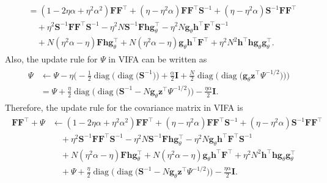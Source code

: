 \documentclass[msc,deptreport.inf]{infthesis} %
\newcommand{\matr}[1]{\mathbf{#1}}
\newcommand{\diag}{\mathop{\mathrm{diag}}}
\begin{document}
\begin{align}
\begin{split}
	& = (1 - 2\eta \alpha + \eta^2 \alpha^2) \matr{F}\matr{F}^\intercal
	+ (\eta - \eta^2 \alpha) \matr{F} \matr{F}^\intercal \matr{S}^{-1}
	+ (\eta - \eta^2 \alpha) \matr{S}^{-1} \matr{F} \matr{F}^\intercal \\
	& \quad + \eta^2 \matr{S}^{-1} \matr{F} \matr{F}^\intercal \matr{S}^{-1}
	- \eta^2 N \matr{S}^{-1} \matr{F} \matr{h} \matr{g}_\theta^\intercal
	- \eta^2 N \matr{g}_\theta \matr{h}^\intercal \matr{F}^\intercal \matr{S}^{-1} \\
	& \quad + N (\eta^2 \alpha - \eta) \matr{F} \matr{h} \matr{g}_\theta^\intercal
	+ N (\eta^2 \alpha - \eta) \matr{g}_\theta \matr{h}^\intercal \matr{F}^\intercal 
	+ \eta^2 N^2 \matr{h}^\intercal \matr{h} \matr{g}_\theta \matr{g}_\theta^\intercal.
\end{split}
\end{align}
Also, the update rule for $\Psi$ in VIFA can be written as
\begin{align}
\begin{split}
	\Psi & \leftarrow \Psi - \eta\Big(
		-\frac{1}{2} \diag\big(\diag\big(\matr{S}^{-1}\big)\big) 
		+\frac{\alpha}{2} \matr{I} 
		+\frac{N}{2} \diag\big(\diag\big( \matr{g}_\theta \matr{z}^\intercal \Psi^{-1/2} \big)\big) 
	\Big) \\
	& = \Psi +
		\frac{\eta}{2} \diag\Big(\diag\big(\matr{S}^{-1} - N \matr{g}_\theta \matr{z}^\intercal \Psi^{-1/2} \big)\Big) 
		- \frac{\eta \alpha}{2} \matr{I}.
\end{split}
\end{align}
Therefore, the update rule for the covariance matrix in VIFA is
\begin{align}
\begin{split}
	\matr{F}\matr{F}^\intercal + \Psi
	& \leftarrow (1 - 2\eta \alpha + \eta^2 \alpha^2) \matr{F}\matr{F}^\intercal
	+ (\eta - \eta^2 \alpha) \matr{F} \matr{F}^\intercal \matr{S}^{-1}
	+ (\eta - \eta^2 \alpha) \matr{S}^{-1} \matr{F} \matr{F}^\intercal \\
	& \quad + \eta^2 \matr{S}^{-1} \matr{F} \matr{F}^\intercal \matr{S}^{-1}
	- \eta^2 N \matr{S}^{-1} \matr{F} \matr{h} \matr{g}_\theta^\intercal
	- \eta^2 N \matr{g}_\theta \matr{h}^\intercal \matr{F}^\intercal \matr{S}^{-1} \\
	& \quad + N (\eta^2 \alpha - \eta) \matr{F} \matr{h} \matr{g}_\theta^\intercal
	+ N (\eta^2 \alpha - \eta) \matr{g}_\theta \matr{h}^\intercal \matr{F}^\intercal 
	+ \eta^2 N^2 \matr{h}^\intercal \matr{h} \matr{g}_\theta \matr{g}_\theta^\intercal \\
	& \quad + \Psi +
	\frac{\eta}{2} \diag\Big(\diag\big(\matr{S}^{-1} - N \matr{g}_\theta \matr{z}^\intercal \Psi^{-1/2} \big)\Big) 
	- \frac{\eta \alpha}{2} \matr{I}.
\end{split}
\end{align}
\end{document}
